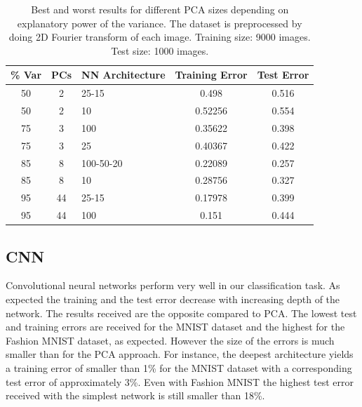 \documentclass[letterpaper,12pt]{article}
\begin{document}
\begin{table}[p]
\centering
  \begin{tabular}{|cc|l|c|c|}
  	\hline
    \% Var & PCs & NN Architecture & Training Error & Test Error \\
    \hline
    \hline
    50 &2 & 25-15 & 0.498     & 0.516\\
    50 & 2 & 10 & 0.52256     & 0.554\\
    \hline
    75 & 3 & 100 & 0.35622    &  0.398\\
    75 & 3 & 25 & 0.40367   &   0.422\\
    \hline
    85 & 8 & 100-50-20 & 0.22089    &  0.257\\
    85 & 8 & 10 & 0.28756    &  0.327\\
    \hline
    95 & 44 & 25-15 & 0.17978    &  0.399 \\
    95 & 44 & 100 & 0.151   &   0.444\\
    \hline
  \end{tabular}
    \vspace{0.5em}
  \caption{Best and worst results for different PCA sizes depending on explanatory power of the variance. The dataset is preprocessed by doing 2D Fourier transform of each image. Training size: 9000 images. Test size: 1000 images.}
\end{table}

\subsection*{CNN}

Convolutional neural networks perform very well in our classification task. As expected the training and the test error decrease with increasing depth of the network. The results received are the opposite compared to PCA. The lowest test and training errors are received for the MNIST dataset and the highest for the Fashion MNIST dataset, as expected. However the size of the errors is much smaller than for the PCA approach. For instance, the deepest architecture yields a training error of smaller than 1\% for the MNIST dataset with a corresponding test error of approximately 3\%. Even with Fashion MNIST the highest test error received with the simplest network is still smaller than 18\%.
\end{document}

